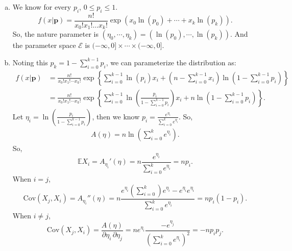 \begin{solution}
    \begin{enumerate}[(a)]
        \item We know for every $p_i$, \(0\leqslant p_i\leqslant 1\). 
        \[
            f(x|\mathbf{p})=\frac{n !}{x_{0} ! x_{1} ! \ldots x_{k} !} \exp\left(x_0\ln (p_0)+\cdots+x_k\ln (p_k)\right). 
        \]
        So, the nature parameter is $(\eta_0,\cdots,\eta_k)=(\ln(p_0),\cdots,\ln(p_k))$. And the parameter space \(\mathcal{E}\) is \((-\infty,0]\times\cdots\times(-\infty,0]\). 
        \item Noting this $p_{k}=1-\sum_{i=0}^{k-1}p_i$, we can parameterize the distribution as:
        \[
            \begin{aligned}
                f(x|\mathbf{p})&=\frac{n!}{x_0!x_1!\cdots x_k!}\exp\left\{\sum_{i=0}^{k-1}\ln(p_i)x_i+\left(n-\sum_{i=0}^{k-1}x_i\right)\ln\left(1-\sum_{i=0}^{k-1}p_i\right)\right\}\\
                &=\frac{n!}{x_0!x_1!\cdots x_k!}\exp\left\{\sum_{i=0}^{k-1}\ln\left(\frac{p_i}{1-\sum_{i=0}^{k-1}p_i}\right)x_i+n\ln\left(1-\sum_{i=0}^{k-1}p_i\right)\right\}. 
            \end{aligned}
        \]
        Let $\eta_i=\ln\left(\frac{p_i}{1-\sum_{i=0}^{k-1}p_i}\right)$, then we know $p_i=\frac{e^{\eta_i}}{\sum_{i=0}^ke^{\eta_i}}$. So, 
        \[
            \begin{aligned}
                A(\eta)=n\ln\left(\sum_{i=0}^ke^{\eta_i}\right). 
            \end{aligned}
        \]
        So, 
        \[
            \mathbb{E}X_i=A_{\eta_i}'(\eta)=n\frac{e^{\eta_i}}{\sum_{i=0}^ke^{\eta_i}}=np_i. 
        \]
        When $i=j$, 
        \[
            \text{Cov}(X_j,X_i)=A_{\eta_i}''(\eta)=n\frac{e^{\eta_i}(\sum_{i=0}^k)e^{\eta_i}-e^{\eta_i}e^{\eta_i}}{\sum_{i=0}^ke^{\eta_i}}=np_i(1-p_i). 
        \]
        When $i\not=j$, 
        \[
            \text{Cov}(X_j,X_i)=\frac{A(\eta)}{\partial\eta_i\,\partial\eta_j}=ne^{\eta_i}\frac{-e^{\eta_j}}{(\sum_{i=0}^ke^{\eta_i})^2}=-np_ip_j. 
        \]
    \end{enumerate}
\end{solution}

